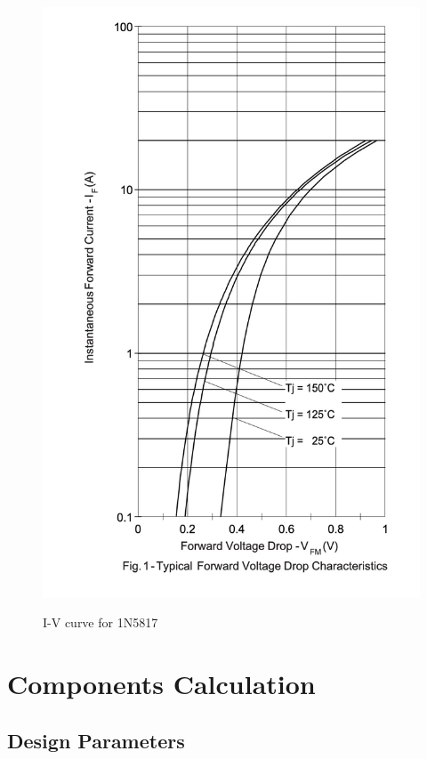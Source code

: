 \documentclass{article}
\begin{document}
\begin{figure}[ht]
    \centering{}
    \includegraphics[height=0.5\textheight]{img/I-V-plot.jpg}
    \label{fig:IV-curve-diode}
    \caption{I-V curve for 1N5817}
\end{figure}

\section{Components Calculation}

\subsection{Design Parameters}
\end{document}
